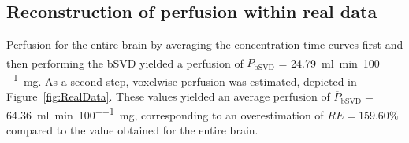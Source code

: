 \documentclass[final,5p,times,twocolumn]{elsarticle}
\begin{document}
%

	
	\subsection{Reconstruction of perfusion within real data}\label{sec:resultsrealdata}
	 Perfusion for the entire brain by averaging the concentration time curves first and then performing the bSVD yielded a perfusion of $P_{\mathrm{bSVD}}$ = \SI{24.79}{\milli\litre\per\minute\per100\milli\gram}. As a second step, voxelwise perfusion was estimated, depicted in Figure~\ref{fig:RealData}. These values yielded an average perfusion of $\overline{P}_{\mathrm{bSVD}} = $\SI{64.36}{\milli\litre\per\minute\per100\milli\gram}, corresponding to an overestimation of $RE = 159.60\%$ compared to the value obtained for the entire brain.	
\end{document}
